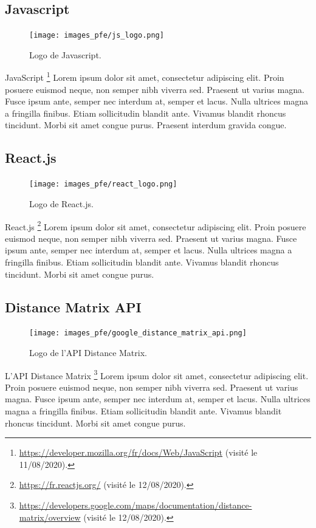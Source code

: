 \vspace{.5cm}

\subsection*{Javascript}
\begin{figure}
  \centering
  \texttt{[image: images\_pfe/js\_logo.png]}
  \caption{Logo de Javascript.}
\end{figure}
\FloatBarrier
JavaScript \footnote{\url{https://developer.mozilla.org/fr/docs/Web/JavaScript} (visité le 11/08/2020).} Lorem ipsum dolor sit amet, consectetur adipiscing elit. Proin posuere euismod neque, non semper nibh viverra sed. Praesent ut varius magna. Fusce ipsum ante, semper nec interdum at, semper et lacus. Nulla ultrices magna a fringilla finibus. Etiam sollicitudin blandit ante. Vivamus blandit rhoncus tincidunt. Morbi sit amet congue purus. Praesent interdum gravida congue.

\vspace{3cm}

\subsection*{React.js}

\begin{figure}
  \centering
  \texttt{[image: images\_pfe/react\_logo.png]}
  \caption{Logo de React.js.}
\end{figure}
\FloatBarrier
React.js \footnote{\url{https://fr.reactjs.org/} (visité le 12/08/2020).} Lorem ipsum dolor sit amet, consectetur adipiscing elit. Proin posuere euismod neque, non semper nibh viverra sed. Praesent ut varius magna. Fusce ipsum ante, semper nec interdum at, semper et lacus. Nulla ultrices magna a fringilla finibus. Etiam sollicitudin blandit ante. Vivamus blandit rhoncus tincidunt. Morbi sit amet congue purus.

\vspace{1cm}

\subsection*{Distance Matrix API}
\begin{figure}
  \centering
  \texttt{[image: images\_pfe/google\_distance\_matrix\_api.png]}
  \caption{Logo de l'API Distance Matrix.}
\end{figure}
\FloatBarrier
L'API Distance Matrix \footnote{\url{https://developers.google.com/maps/documentation/distance-matrix/overview} (visité le 12/08/2020).} Lorem ipsum dolor sit amet, consectetur adipiscing elit. Proin posuere euismod neque, non semper nibh viverra sed. Praesent ut varius magna. Fusce ipsum ante, semper nec interdum at, semper et lacus. Nulla ultrices magna a fringilla finibus. Etiam sollicitudin blandit ante. Vivamus blandit rhoncus tincidunt. Morbi sit amet congue purus.

